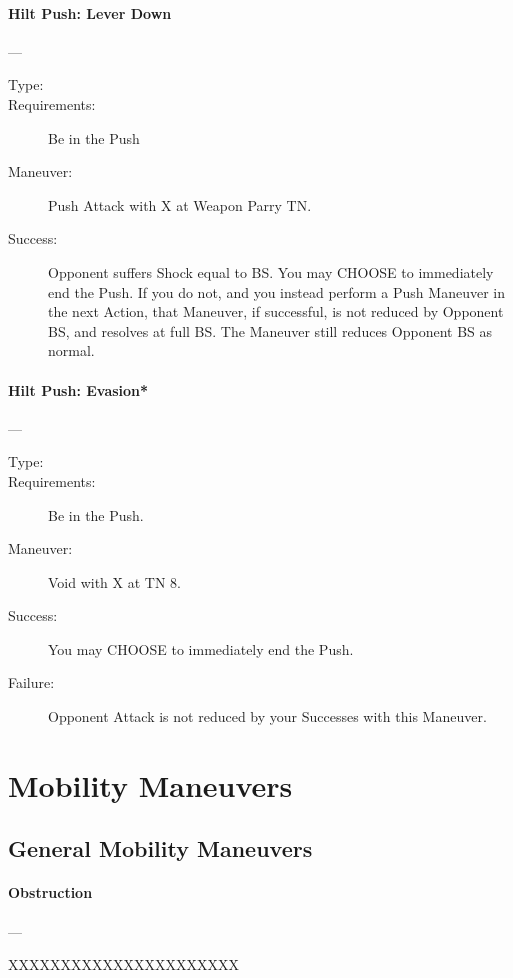 \documentclass[oneside,11pt,english]{book}
\begin{document}
\paragraph{\large\label{man:Hilt Push: Lever Down}Hilt Push: Lever Down}---\quad{\large[2+X]}
\vspace{-10pt}\begin{description}
\item [Type:]
\item [Requirements:] Be in the Push 
\item [Maneuver:] Push Attack with X at Weapon Parry TN. 
\item [Success:] Opponent suffers Shock equal to BS. You may CHOOSE to immediately end the Push. If you 
  do not, and you instead perform a Push Maneuver in the next Action, that Maneuver, if successful, is not 
  reduced by Opponent BS, and resolves at full BS. The Maneuver still reduces Opponent BS as normal. 
\end{description}

\paragraph{\large\label{man:Hilt Push: Evasion*}Hilt Push: Evasion*}---\quad{\large[2+Encumbrance+X]}
\vspace{-10pt}\begin{description} 
\item [Type:] 
\item [Requirements:] Be in the Push. 
\item [Maneuver:] Void with X at TN 8. 
\item [Success:] You may CHOOSE to immediately end the Push. 
\item [Failure:] Opponent Attack is not reduced by your Successes with this Maneuver. 
\end{description}
\section{Mobility Maneuvers}
\subsection{General Mobility Maneuvers}
\paragraph{\large\label{man:Obstruction}Obstruction}---\quad{\large[????????]}

XXXXXXXXXXXXXXXXXXXXXX 
\end{document}
